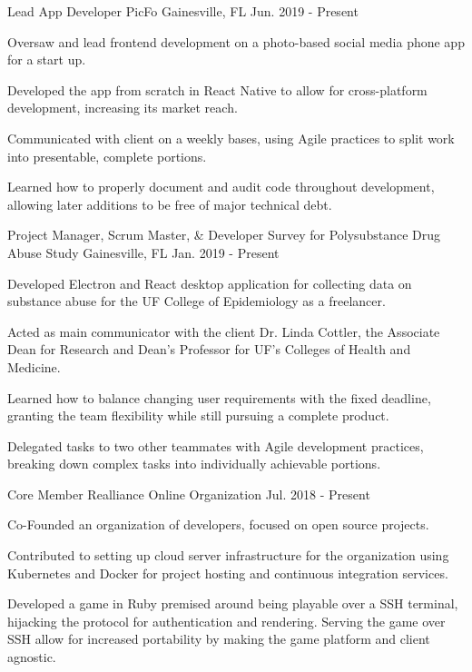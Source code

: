 \begin{cventries}
  \cventry
  {Lead App Developer}
  {PicFo}
  {Gainesville, FL}
  {Jun. 2019 - Present}
  {
    \begin{cvitems}
      \item {Oversaw and lead frontend development on a photo-based social media phone app for a start up.}
      \item {Developed the app from scratch in React Native to allow for cross-platform development, increasing its market reach.}
      \item {Communicated with client on a weekly bases, using Agile practices to split work into presentable, complete portions.}
      \item {Learned how to properly document and audit code throughout development, allowing later additions to be free of major technical debt.}
    \end{cvitems}
  }
  \cventry
    {Project Manager, Scrum Master, \& Developer}
    {Survey for Polysubstance Drug Abuse Study}
    {Gainesville, FL}
    {Jan. 2019 - Present}
    {
      \begin{cvitems}
        \item {Developed Electron and React desktop application for collecting data on substance abuse for the UF College of Epidemiology as a freelancer.}
        \item {Acted as main communicator with the client Dr. Linda Cottler, the Associate Dean for Research and Dean's Professor for UF's Colleges of Health and Medicine.}
        \item {Learned how to balance changing user requirements with the fixed deadline, granting the team flexibility while still pursuing a complete product.}
        \item {Delegated tasks to two other teammates with Agile development practices, breaking down complex tasks into individually achievable portions.}
      \end{cvitems}
    }
  \cventry
    {Core Member}
    {Realliance}
    {Online Organization}
    {Jul. 2018 - Present}
    {
      \begin{cvitems}
        \item {Co-Founded an organization of developers, focused on open source projects.}
        \item {Contributed to setting up cloud server infrastructure for the organization using Kubernetes and Docker for project hosting and continuous integration services.}
        \item {Developed a game in Ruby premised around being playable over a SSH terminal, hijacking the protocol for authentication and rendering. Serving the game over SSH allow for increased portability by making the game platform and client agnostic.}
      \end{cvitems}
    }
\end{cventries}
